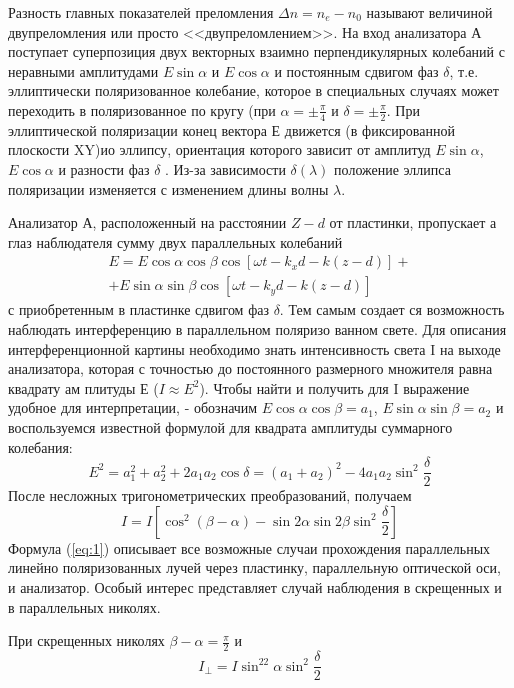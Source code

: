 Разность главных показателей преломления $\Delta n=n_e-n_0$
называют величиной двупреломления или просто <<двупреломлением>>.
На вход анализатора А поступает суперпозиция двух векторных
взаимно перпендикулярных колебаний с неравными амплитудами
$E\sin\alpha$ и $E\cos\alpha$ и постоянным сдвигом фаз $\delta$, т.е. эллиптически поляризованное колебание, которое
в специальных случаях может переходить в поляризованное по кру­гу 
(при $\alpha=\pm\frac{\pi}{4}$ и $\delta=\pm\frac{\pi}{2}$. При эллиптической
поляризации конец вектора Е движется (в фиксированной плоскости
XY)ио эллипсу, ориентация которого зависит от амплитуд
$E\sin\alpha$, $E\cos\alpha$ и разности фаз $\delta$ . Из-за
зависимости $\delta(\lambda)$ положение эллипса поляризации изменяется
с изменением длины волны $\lambda$.

Анализатор А, расположенный на расстоянии $Z-d$ от
пластинки, пропускает а глаз наблюдателя сумму двух параллельных
колебаний 
\begin{gather}
	E=E\cos\alpha\cos\beta\cos\left[\omega t -k_xd-k(z-d) \right]+\\
	+E\sin\alpha\sin\beta\cos\left[\omega t -k_yd-k(z-d) \right]
\end{gather}
с приобретенным в пластинке сдвигом фаз $\delta$. Тем самым создает­
ся возможность наблюдать интерференцию в параллельном поляризо­
ванном свете. Для описания интерференционной картины необходимо
знать интенсивность света I на выходе анализатора, которая с
точностью до постоянного размерного множителя равна квадрату ам­
плитуды Е ($I\approx E^2$). Чтобы найти и получить для I выражение
удобное для интерпретации, - обозначим $E\cos\alpha\cos\beta=a_1$,
$E\sin\alpha\sin\beta=a_2$  и воспользуемся известной формулой
для квадрата амплитуды суммарного колебания:
\begin{equation}
	E^2=a_1^2+a_2^2+2a_1a_2\cos\delta=(a_1+a_2)^2-4a_1a_2\sin^2\frac{\delta}{2}
\end{equation}
После несложных тригонометрических преобразований, получаем
\begin{equation}
	\label{eq:1}
	I=I\left[\cos^2(\beta-\alpha)-\sin2\alpha\sin2\beta\sin^2\frac{\delta}{2} \right]
\end{equation}
Формула (\ref{eq:1}) описывает все возможные случаи прохождения параллельных линейно поляризованных лучей через пластинку, параллельную
оптической оси, и анализатор. Особый интерес представляет слу­чай наблюдения в скрещенных и в параллельных николях.

При скрещенных николях $\beta-\alpha=\frac{\pi}{2}$ и
\begin{equation}
	I_{\bot}=I\sin^22\alpha \sin^2\frac{\delta}{2}
\end{equation}

